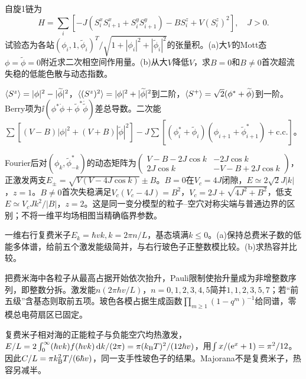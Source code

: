 \begin{exercise}[原题1(a)--(b)]
自旋1链为
\begin{equation}
H=\sum_i[-J(S_i^xS_{i+1}^x+S_i^yS_{i+1}^y)-BS_i^z+V(S_i^z)^2],\quad J>0.
\end{equation}
试验态为各站$(\phi_i,1,\widetilde\phi_i)^T/\sqrt{1+|\phi_i|^2+|\widetilde\phi_i|^2}$的张量积。(a)大$V$的Mott态$\phi=\widetilde\phi=0$附近求二次相空间作用量。(b)从大$V$降低$V$，求$B=0$和$B\ne0$首次超流失稳的低能色散与动态指数。
\end{exercise}
\begin{solution}
$\langle S^z\rangle=|\phi|^2-|\widetilde\phi|^2$，$\langle (S^z)^2\rangle=|\phi|^2+|\widetilde\phi|^2$到二阶，$\langle S^+\rangle=\sqrt2(\phi^*+\widetilde\phi)$到一阶。Berry项为$\ii(\phi^*\dot\phi+\widetilde\phi^*\dot{\widetilde\phi})$差总导数。二次能$\sum[(V-B)|\phi|^2+(V+B)|\widetilde\phi|^2]-J\sum[(\phi_i^*+\widetilde\phi_i)(\phi_{i+1}+\widetilde\phi_{i+1}^*)+\mathrm{c.c.}]$。

Fourier后对$(\phi_k,\widetilde\phi_{-k}^*)$的动态矩阵为$\left(\begin{smallmatrix}V-B-2J\cos k&-2J\cos k\\2J\cos k&-V-B+2J\cos k\end{smallmatrix}\right)$，正激发两支$E_\pm=\sqrt{V(V-4J\cos k)}\pm B$。$B=0$在$V_c=4J$闭隙，$E\simeq2\sqrt2J|k|$，$z=1$。$B\ne0$首次失稳满足$V_c(V_c-4J)=B^2$，$V_c=2J+\sqrt{4J^2+B^2}$，低支$E\simeq V_cJk^2/|B|$，$z=2$。这是同一变分模型的粒子--空穴对称尖端与普通边界的区别；不将一维平均场相图当精确临界参数。
\end{solution}
\begin{exercise}[原题2(a)--(b)]
一维右行复费米子$E_k=\hbar vk,k=2\pi n/L$，基态填满$k\le0$。(a)保持总费米子数的低能多体谱，给前五个激发能级简并，与右行玻色子正整数模比较。(b)求热容并比较。
\end{exercise}
\begin{solution}
把费米海中各粒子从最高占据开始依次抬升，Pauli限制使抬升量成为非增整数序列，即整数分拆。激发能$n(2\pi\hbar v/L)$，$n=0,1,2,3,4,5$简并$1,1,2,3,5,7$；若“前五级”含基态则取前五项。玻色各模占据生成函数$\prod_{m\ge1}(1-q^m)^{-1}$给同谱，零模总电荷扇区已固定。

复费米子相对海的正能粒子与负能空穴均热激发，$E/L=2\int_0^\infty(\hbar vk)f(\hbar vk)\,\mathrm d k/(2\pi)=\pi(k_{\mathrm B} T)^2/(12\hbar v)$，用$\int x/(\mathrm e^x+1)=\pi^2/12$。因此$C/L=\pi k_{\mathrm B}^2T/(6\hbar v)$，同一支手性玻色子的结果。Majorana不是复费米子，热容另减半。
\end{solution}
